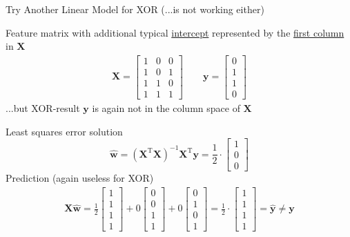 \documentclass[mathserif, aspectratio=1610]{intbeamer}
\begin{document}
\begin{frame}[t]{Try Another Linear Model for XOR (...is not working either)}

Feature matrix with additional typical \underline{intercept} represented by the \underline{first column} in $\bm{X}$
\begin{align*}
\bm{X} =
\begin{bmatrix}
1 & 0 & 0\\
1 & 0 & 1\\
1 & 1 & 0\\
1 & 1 & 1
\end{bmatrix}\qquad
\bm{y} =
\begin{bmatrix}
0\\
1\\
1\\
0
\end{bmatrix}
\end{align*}
...but XOR-result $\bm{y}$ is again not in the column space of $\bm{X}$


Least squares error solution
$$\hat{\bm{w}} = (\bm{X}^\mathrm{T} \bm{X})^{-1} \bm{X}^\mathrm{T} \bm{y}
=
\frac{1}{2}\cdot
\begin{bmatrix}
1\\
0\\
0
\end{bmatrix}
$$
Prediction (again useless for XOR)
\begin{align*}
\bm{X} \hat{\bm{w}} =
\frac{1}{2}
\begin{bmatrix}
1\\
1\\
1\\
1
\end{bmatrix}
+
0
\begin{bmatrix}
0\\
0\\
1\\
1
\end{bmatrix}
+
0
\begin{bmatrix}
0\\
1\\
0\\
1
\end{bmatrix}
=
\frac{1}{2}\cdot
\begin{bmatrix}
1\\
1\\
1\\
1
\end{bmatrix}
=\hat{\bm{y}} \neq \bm{y}
\end{align*}
\end{frame}
\end{document}
